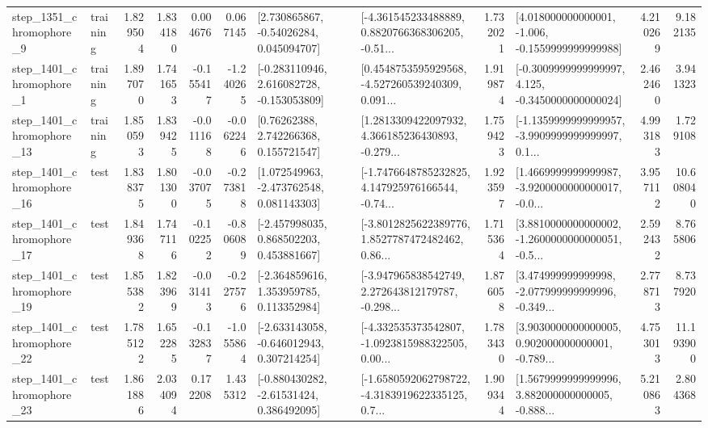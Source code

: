 \begin{tabular}{llrrrrllrlrr}
  step\_1351\_chromophore\_9 &  training &      1.829504 &    1.834180 &      0.004676 &  0.067145 &     [2.730865867, -0.54026284, 0.045094707] &  [-4.361545233488889, 0.8820766368306205, -0.51... &       1.732021 &   [4.018000000000001, -1.006, -0.1559999999999988] &            4.210269 &          9.182135 \\
  step\_1401\_chromophore\_1 &  training &      1.897070 &    1.741653 &     -0.155417 & -1.240265 &   [-0.283110946, 2.616082728, -0.153053809] &  [0.4548753595929568, -4.527260539240309, 0.091... &       1.919874 &  [-0.3009999999999997, 4.125, -0.3450000000000024] &            2.462460 &          3.941323 \\
 step\_1401\_chromophore\_13 &  training &      1.850593 &    1.839425 &     -0.011168 & -0.062246 &      [0.76262388, 2.742266368, 0.155721547] &  [1.2813309422097932, 4.366185236430893, -0.279... &       1.759423 &  [-1.1359999999999957, -3.9909999999999997, 0.1... &            4.993183 &          1.729108 \\
 step\_1401\_chromophore\_16 &      test &      1.838375 &    1.801300 &     -0.037075 & -0.273818 &    [1.072549963, -2.473762548, 0.081143303] &  [-1.7476648785232825, 4.147925976166544, -0.74... &       1.923597 &  [1.4669999999999987, -3.9200000000000017, -0.0... &            3.957112 &         10.608040 \\
 step\_1401\_chromophore\_17 &      test &      1.849368 &    1.747116 &     -0.102252 & -0.806089 &    [-2.457998035, 0.868502203, 0.453881667] &  [-3.8012825622389776, 1.8527787472482462, 0.86... &       1.715364 &  [3.8810000000000002, -1.2600000000000051, -0.5... &            2.592432 &          8.765806 \\
 step\_1401\_chromophore\_19 &      test &      1.855382 &    1.823969 &     -0.031413 & -0.227576 &    [-2.364859616, 1.353959785, 0.113352984] &  [-3.947965838542749, 2.272643812179787, -0.298... &       1.876058 &  [3.474999999999998, -2.077999999999996, -0.349... &            2.778713 &          8.737920 \\
 step\_1401\_chromophore\_22 &      test &      1.785122 &    1.652285 &     -0.132837 & -1.055864 &   [-2.633143058, -0.646012943, 0.307214254] &  [-4.332535373542807, -1.0923815988322505, 0.00... &       1.783430 &  [3.9030000000000005, 0.902000000000001, -0.789... &            4.753013 &         11.193900 \\
 step\_1401\_chromophore\_23 &      test &      1.861886 &    2.034094 &      0.172208 &  1.435312 &    [-0.880430282, -2.61531424, 0.386492095] &  [-1.6580592062798722, -4.3183919622335125, 0.7... &       1.909344 &  [1.5679999999999996, 3.882000000000005, -0.888... &            5.210863 &          2.804368 \\

\end{tabular}
